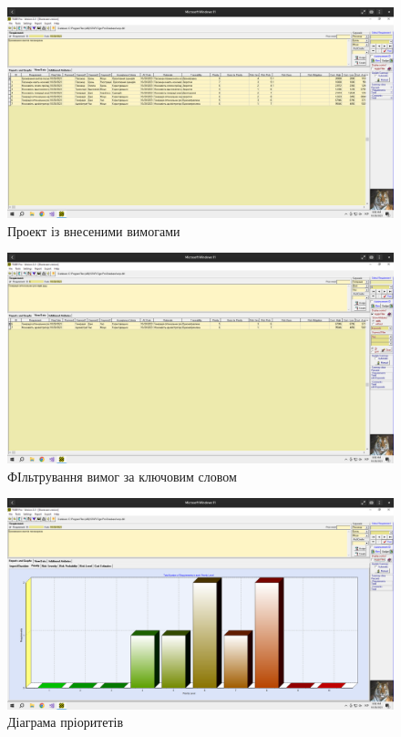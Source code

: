 \documentclass[14pt]{extreport}
\begin{document}
\begin{normalsize}
	\begin{figure}[H]
		\centering
		\includegraphics[scale=0.25]{3}
		\caption{Проект із внесеними вимогами}
	\end{figure}
	
	\begin{figure}[H]
		\centering
		\includegraphics[scale=0.25]{4}
		\caption{ФІльтрування вимог за ключовим словом}
	\end{figure}
	
	\begin{figure}[H]
		\centering
		\includegraphics[scale=0.25]{5}
		\caption{Діаграма пріоритетів}
	\end{figure}
	

\end{normalsize}
\end{document}
